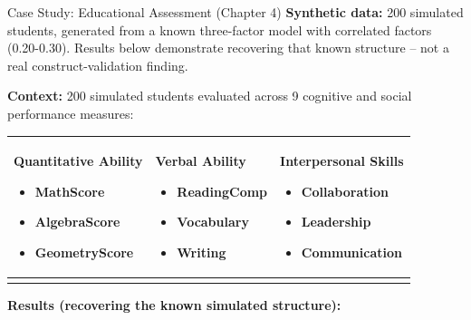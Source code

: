 \documentclass[aspectratio=169,ignorenonframetext]{beamer}
\begin{document}
\begin{frame}[shrink]{Case Study: Educational Assessment (Chapter 4)}
\textbf{Synthetic data:} 200 simulated students, generated from a known
three-factor model with correlated factors (0.20-0.30). Results below
demonstrate recovering that known structure -- not a real
construct-validation finding.

\textbf{Context:} 200 simulated students evaluated across 9 cognitive
and social performance measures:

{\def\LTcaptype{none} %
\begin{longtable}[]{@{}
  >{\raggedright\arraybackslash}p{}
  >{\raggedright\arraybackslash}p{}
  >{\raggedright\arraybackslash}p{}@{}}
\toprule\noalign{}
\endhead
\begin{minipage}[t]{\linewidth}\raggedright
\textbf{Quantitative Ability}

\begin{itemize}
\item
  MathScore
\item
  AlgebraScore
\item
  GeometryScore
\end{itemize}
\end{minipage} & \begin{minipage}[t]{\linewidth}\raggedright
\textbf{Verbal Ability}

\begin{itemize}
\item
  ReadingComp
\item
  Vocabulary
\item
  Writing
\end{itemize}
\end{minipage} & \begin{minipage}[t]{\linewidth}\raggedright
\textbf{Interpersonal Skills}

\begin{itemize}
\item
  Collaboration
\item
  Leadership
\item
  Communication
\end{itemize}
\end{minipage} \\
\bottomrule\noalign{}
\end{longtable}
}

\textbf{Results (recovering the known simulated structure):}


\end{frame}
\end{document}
